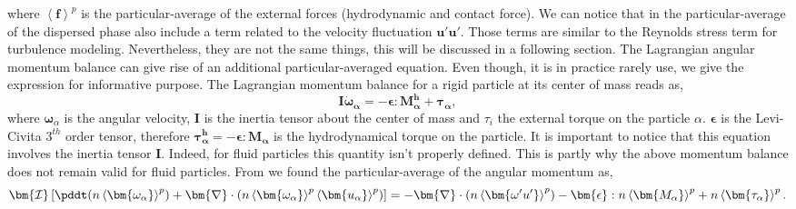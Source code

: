 where $\left<\bm{f}\right>^p$ is the particular-average of the external forces (hydrodynamic and contact force).
We can notice that in the particular-average of the dispersed phase also include a term related to the velocity fluctuation $\bm{u'u'}$. 
Those terms are similar to the Reynolds stress term for turbulence modeling.
Nevertheless, they are not the same things, this will be discussed in a following section. 
The Lagrangian angular momentum balance can give rise of an additional particular-averaged equation. 
Even though, it is in practice rarely use, we give the expression for informative purpose.
The Lagrangian momentum balance for a rigid particle at its center of mass reads as,
\begin{equation}
    \mathcal{\bm{I}}\bm{\dot{\omega}_\alpha} = - \bm{\epsilon} : \bm{M^{h}_\alpha} + \bm{\tau_\alpha},
    \label{eq:newtion2law2}
\end{equation}
where $\bm{\omega}_\alpha$ is the angular velocity, $\mathcal{\bm{I}}$ is the inertia tensor about the center of mass and $\tau_i$ the external torque on the particle $\alpha$. 
$\bm{\epsilon}$ is the Levi-Civita $3^{th}$ order tensor, therefore $\bm{\tau^h_\alpha} = - \bm{\epsilon} : \bm{M_\alpha}$ is the hydrodynamical torque on the particle.  
It is important to notice that this equation involves the inertia tensor $\mathcal{\bm{I}}$.
Indeed, for fluid particles this quantity isn't properly defined.
This is partly why the above momentum balance does not remain valid for fluid particles.
From \citet{jackson1997locally} we found the particular-average of the angular momentum as,
\begin{equation}
    \bm{\mathcal{I}} \left[\pddt(n\left<\bm{\omega_\alpha}\right>^p)
    +\bm{\nabla}\cdot(n\left<\bm{\omega_\alpha }\right>^p\left<\bm{u_\alpha}\right>^p)\right] 
    = -\bm{\nabla}\cdot(n\left<\bm{\omega'u'}\right>^p) 
    - \bm{\epsilon} : n\left<\bm{M_\alpha}\right>^p 
    + n\left<\bm{\tau_\alpha}\right>^p.
    \label{eq:Iavg}
\end{equation}

